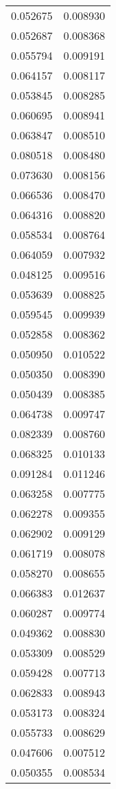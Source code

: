 \begin{longtable}[c]{ll}
    0.052675 & 0.008930 \\
    0.052687 & 0.008368 \\
    0.055794 & 0.009191 \\
    0.064157 & 0.008117 \\
    0.053845 & 0.008285 \\
    0.060695 & 0.008941 \\
    0.063847 & 0.008510 \\
    0.080518 & 0.008480 \\
    0.073630 & 0.008156 \\
    0.066536 & 0.008470 \\
    0.064316 & 0.008820 \\
    0.058534 & 0.008764 \\
    0.064059 & 0.007932 \\
    0.048125 & 0.009516 \\
    0.053639 & 0.008825 \\
    0.059545 & 0.009939 \\
    0.052858 & 0.008362 \\
    0.050950 & 0.010522 \\
    0.050350 & 0.008390 \\
    0.050439 & 0.008385 \\
    0.064738 & 0.009747 \\
    0.082339 & 0.008760 \\
    0.068325 & 0.010133 \\
    0.091284 & 0.011246 \\
    0.063258 & 0.007775 \\
    0.062278 & 0.009355 \\
    0.062902 & 0.009129 \\
    0.061719 & 0.008078 \\
    0.058270 & 0.008655 \\
    0.066383 & 0.012637 \\
    0.060287 & 0.009774 \\
    0.049362 & 0.008830 \\
    0.053309 & 0.008529 \\
    0.059428 & 0.007713 \\
    0.062833 & 0.008943 \\
    0.053173 & 0.008324 \\
    0.055733 & 0.008629 \\
    0.047606 & 0.007512 \\
    0.050355 & 0.008534 \\

\end{longtable}
